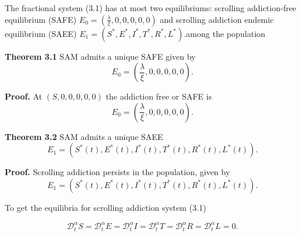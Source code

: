 \documentclass[10pt]{NSP1}
\newcommand{\CD}{\mathcal{D}}
\begin{document}
The fractional system (3.1) has at most two equilibriums: scrolling addiction-free equilibrium (SAFE) $E_0 = \left( \frac{\lambda}{\xi}, 0, 0, 0, 0, 0 \right)$ and scrolling addiction endemic equilibrium (SAEE) $E_1 = \left( S^\ast, E^\ast, I^\ast, T^\ast, R^\ast, L^\ast \right)$.among the population

\textbf{Theorem 3.1} SAM admits a unique SAFE given by
\begin{equation}
E_0 = \left( \frac{\lambda}{\xi}, 0, 0, 0, 0, 0 \right).
\tag{3.13}
\end{equation}

\textbf{Proof.} At $(S,0,0,0,0,0)$ the addiction free or SAFE is
\begin{equation}
E_0 = \left( \frac{\lambda}{\xi}, 0, 0, 0, 0, 0 \right).
\tag{3.14}
\end{equation}

\textbf{Theorem 3.2} SAM admits a unique SAEE
\begin{equation}
E_1 = \left( S^\ast(t), E^\ast(t), I^\ast(t), T^\ast(t), R^\ast(t), L^\ast(t) \right).
\tag{3.15}
\end{equation}

\textbf{Proof.} Scrolling addiction persists in the population, given by
\begin{equation}
E_1 = \left( S^\ast(t), E^\ast(t), I^\ast(t), T^\ast(t), R^\ast(t), L^\ast(t) \right).
\end{equation}

To get the equilibria for scrolling addiction system (3.1)

\begin{equation}
\CD_t^\alpha S = \CD_t^\alpha E = \CD_t^\alpha I = \CD_t^\alpha T = \CD_t^\alpha R = \CD_t^\alpha L = 0.
\tag{3.16}
\end{equation}
\end{document}
